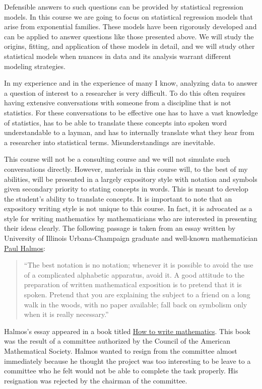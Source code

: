 \documentclass[
]{article}
\begin{document}
Defensible answers to such questions can be provided by statistical
regression models. In this course we are going to focus on statistical
regression models that arise from exponential families. These models
have been rigorously developed and can be applied to answer questions
like those presented above. We will study the origins, fitting, and
application of these models in detail, and we will study other
statistical models when nuances in data and its analysis warrant
different modeling strategies.

In my experience and in the experience of many I know, analyzing data to
answer a question of interest to a researcher is very difficult. To do
this often requires having extensive conversations with someone from a
discipline that is not statistics. For these conversations to be
effective one has to have a vast knowledge of statistics, has to be able
to translate these concepts into spoken word understandable to a layman,
and has to internally translate what they hear from a researcher into
statistical terms. Misunderstandings are inevitable.

This course will not be a consulting course and we will not simulate
such conversations directly. However, materials in this course will, to
the best of my abilities, will be presented in a largely expository
style with notation and symbols given secondary priority to stating
concepts in words. This is meant to develop the student's ability to
translate concepts. It is important to note that an expository writing
style is not unique to this course. In fact, it is advocated as a style
for writing mathematics by mathematicians who are interested in
presenting their ideas clearly. The following passage is taken from an
essay written by University of Illinois Urbana-Champaign graduate and
well-known mathematician
\href{https://en.wikipedia.org/wiki/Paul_Halmos}{Paul Halmos}:

\begin{quote}
``The best notation is no notation; whenever it is possible to avoid the
use of a complicated alphabetic apparatus, avoid it. A good attitude to
the preparation of written mathematical exposition is to pretend that it
is spoken. Pretend that you are explaining the subject to a friend on a
long walk in the woods, with no paper available; fall back on symbolism
only when it is really necessary.''
\end{quote}

Halmos's essay appeared in a book titled
\href{https://bookstore.ams.org/hwm}{How to write mathematics}. This
book was the result of a committee authorized by the Council of the
American Mathematical Society. Halmos wanted to resign from the
committee almost immediately because he thought the project was too
interesting to be leave to a committee who he felt would not be able to
complete the task properly. His resignation was rejected by the chairman
of the committee.
\end{document}
